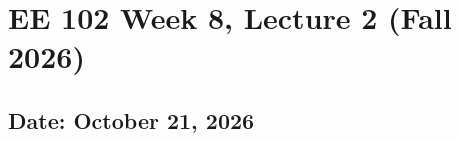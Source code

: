 \documentclass{ee102_notes}
\renewcommand{\releasedate}{October 21, 2026}
\begin{document}
\section*{EE 102 Week 8, Lecture 2 (Fall 2026)}
\subsection*{Date: \releasedate}
\tableofcontents

\end{document}
